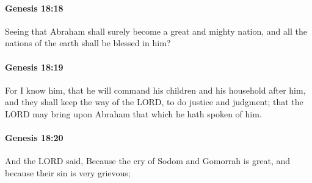 		\paragraph{Genesis 18:18} %
			\label{GENESIS-18-18}

			Seeing that Abraham shall surely become a great and mighty nation, and all the nations of the earth shall be blessed in him?


		\paragraph{Genesis 18:19} %
			\label{GENESIS-18-19}

			For I know him, that he will command his children and his household after him, and they shall keep the way of the LORD, to do justice and judgment; that the LORD may bring upon Abraham that which he hath spoken of him.


		\paragraph{Genesis 18:20} %
			\label{GENESIS-18-20}

			And the LORD said, Because the cry of Sodom and Gomorrah is great, and because their sin is very grievous;


